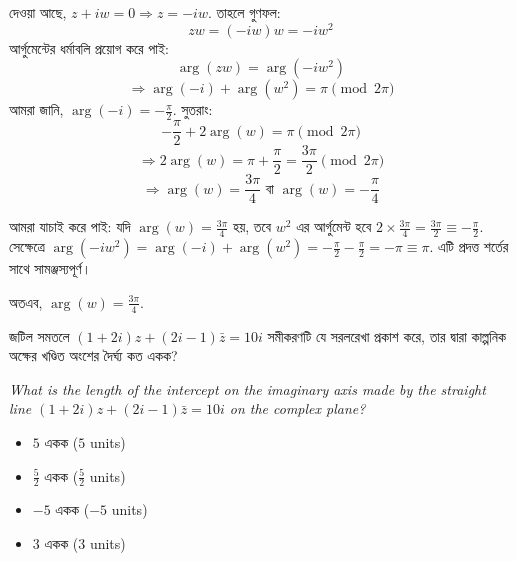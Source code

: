 \documentclass[12pt, a4paper]{article}
\begin{document}
\begin{tcolorbox}[solutionbox={সমাধান (Solution)}]
    \noindent
    দেওয়া আছে, $z + iw = 0 \Rightarrow z = -iw$. তাহলে গুণফল:
    \[ zw = (-iw)w = -iw^2 \]
    আর্গুমেন্টের ধর্মাবলি প্রয়োগ করে পাই:
    \[ \arg(zw) = \arg(-iw^2) \]
    \[ \Rightarrow \arg(-i) + \arg(w^2) = \pi \pmod{2\pi} \]
    আমরা জানি, $\arg(-i) = -\frac{\pi}{2}$. সুতরাং:
    \[ -\frac{\pi}{2} + 2\arg(w) = \pi \pmod{2\pi} \]
    \[ \Rightarrow 2\arg(w) = \pi + \frac{\pi}{2} = \frac{3\pi}{2} \pmod{2\pi} \]
    \[ \Rightarrow \arg(w) = \frac{3\pi}{4} \text{ বা } \arg(w) = -\frac{\pi}{4} \]
    
    \vspace{0.5em}
    আমরা যাচাই করে পাই: যদি $\arg(w) = \frac{3\pi}{4}$ হয়, তবে $w^2$ এর আর্গুমেন্ট হবে $2 \times \frac{3\pi}{4} = \frac{3\pi}{2} \equiv -\frac{\pi}{2}$. সেক্ষেত্রে $\arg(-iw^2) = \arg(-i) + \arg(w^2) = -\frac{\pi}{2} - \frac{\pi}{2} = -\pi \equiv \pi$. এটি প্রদত্ত শর্তের সাথে সামঞ্জস্যপূর্ণ। 
    
    \vspace{0.5em}
    অতএব, $\arg(w) = \frac{3\pi}{4}$.
\end{tcolorbox}
\begin{tcolorbox}[questionbox={প্রশ্ন (Question) 3}]
    \noindent
    জটিল সমতলে $(1+2i)z + (2i-1)\bar{z} = 10i$ সমীকরণটি যে সরলরেখা প্রকাশ করে, তার দ্বারা কাল্পনিক অক্ষের খণ্ডিত অংশের দৈর্ঘ্য কত একক?
    
    \vspace{0.8em}
    \begin{english}
    \noindent\textit{\color{darkgray}
    What is the length of the intercept on the imaginary axis made by the straight line $(1+2i)z + (2i-1)\bar{z} = 10i$ on the complex plane?
    }
    \end{english}
\end{tcolorbox}

\begin{itemize}[label={}, leftmargin=1cm, itemsep=0.5em]
    \item[\textbf{A)}] $5$ একক ($5$ units)
    \item[\textbf{B)}] $\frac{5}{2}$ একক ($\frac{5}{2}$ units)
    \item[\textbf{C)}] $-5$ একক ($-5$ units)
    \item[\textbf{D)}] $3$ একক ($3$ units)
\end{itemize}
\end{document}
